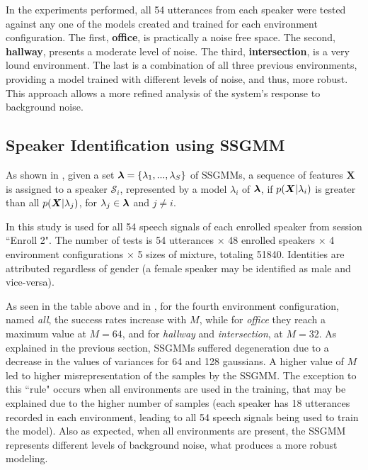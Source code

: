 In the experiments performed, all 54 utterances from each speaker were tested against any one of the models created and trained for each environment configuration. The first, \textbf{office}, is practically a noise free space. The second, \textbf{hallway}, presents a moderate level of noise. The third, \textbf{intersection}, is a very lound environment. The last is a combination of all three previous environments, providing a model trained with different levels of noise, and thus, more robust. This approach allows a more refined analysis of the system's response to background noise.

\subsection{Speaker Identification using SSGMM}

As shown in , given a set $\boldsymbol{\lambda} = \{\lambda_1, ..., \lambda_S\}$ of SSGMMs, a sequence of features $\boldsymbol{X}$ is assigned to a speaker $\mathcal{S}_i$, represented by a model $\lambda_i$ of $\boldsymbol{\lambda}$, if $p(\boldsymbol{X}|\lambda_i)$ is greater than all $p(\boldsymbol{X}|\lambda_j)$, for $\lambda_j \in \boldsymbol{\lambda}$ and $j \ne i$.

In this study  is used for all 54 speech signals of each enrolled speaker from session ``Enroll 2". The number of tests is 54 utterances $\times$ 48 enrolled speakers $\times$ 4 environment configurations $\times$ 5 sizes of mixture, totaling 51840. Identities are attributed regardless of gender (a female speaker may be identified as male and vice-versa).



As seen in the table above and in , for the fourth environment configuration, named \emph{all}, the success rates increase with $M$, while for \emph{office} they reach a maximum value at $M = 64$, and for \emph{hallway} and \emph{intersection}, at $M = 32$. As explained in the previous section, SSGMMs suffered degeneration due to a decrease in the values of variances for 64 and 128 gaussians. A higher value of $M$ led to higher misrepresentation of the samples by the SSGMM. The exception to this ``rule" occurs when all environments are used in the training, that may be explained due to the higher number of samples (each speaker has 18 utterances recorded in each environment, leading to all 54 speech signals being used to train the model). Also as expected, when all environments are present, the SSGMM represents different levels of background noise, what produces a more robust modeling.

